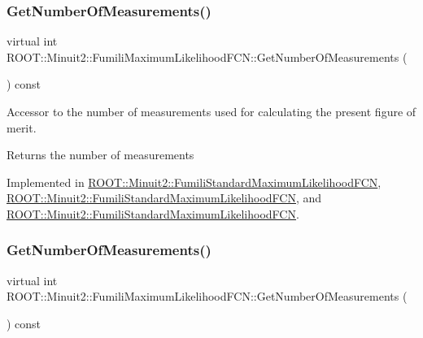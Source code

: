 \subsubsection{\texorpdfstring{GetNumberOfMeasurements()}{GetNumberOfMeasurements()}\hspace{0.1cm}{\footnotesize\ttfamily [1/3]}}
{\footnotesize\ttfamily virtual int R\+O\+O\+T\+::\+Minuit2\+::\+Fumili\+Maximum\+Likelihood\+F\+C\+N\+::\+Get\+Number\+Of\+Measurements (\begin{DoxyParamCaption}{ }\end{DoxyParamCaption}) const\hspace{0.3cm}{\ttfamily [pure virtual]}}

Accessor to the number of measurements used for calculating the present figure of merit.

\begin{DoxyReturn}{Returns}
the number of measurements 
\end{DoxyReturn}


Implemented in \mbox{\hyperlink{classROOT_1_1Minuit2_1_1FumiliStandardMaximumLikelihoodFCN_a09175207d6c0ed94898f3985b4d376d2}{R\+O\+O\+T\+::\+Minuit2\+::\+Fumili\+Standard\+Maximum\+Likelihood\+F\+CN}}, \mbox{\hyperlink{classROOT_1_1Minuit2_1_1FumiliStandardMaximumLikelihoodFCN_a7c1f879db750fb33c206d3edbbd19ae0}{R\+O\+O\+T\+::\+Minuit2\+::\+Fumili\+Standard\+Maximum\+Likelihood\+F\+CN}}, and \mbox{\hyperlink{classROOT_1_1Minuit2_1_1FumiliStandardMaximumLikelihoodFCN_a7c1f879db750fb33c206d3edbbd19ae0}{R\+O\+O\+T\+::\+Minuit2\+::\+Fumili\+Standard\+Maximum\+Likelihood\+F\+CN}}.

\mbox{\label{classROOT_1_1Minuit2_1_1FumiliMaximumLikelihoodFCN_af0a6b5a302f978363074039c7d55d529}} 
\subsubsection{\texorpdfstring{GetNumberOfMeasurements()}{GetNumberOfMeasurements()}\hspace{0.1cm}{\footnotesize\ttfamily [2/3]}}
{\footnotesize\ttfamily virtual int R\+O\+O\+T\+::\+Minuit2\+::\+Fumili\+Maximum\+Likelihood\+F\+C\+N\+::\+Get\+Number\+Of\+Measurements (\begin{DoxyParamCaption}{ }\end{DoxyParamCaption}) const\hspace{0.3cm}{\ttfamily [pure virtual]}}

